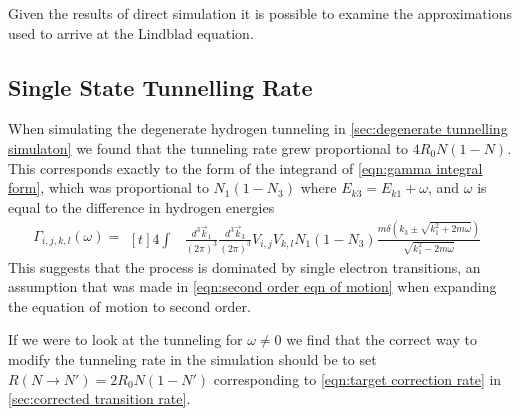 
Given the results of
direct simulation it is
possible to examine
the approximations
used to arrive at
the Lindblad equation.

\subsection{Single State Tunnelling Rate}\label{sec:lindblad corrected tunneling}
When simulating the
degenerate hydrogen tunneling in
\cref{sec:degenerate tunnelling simulaton}
we found that the tunneling rate
grew proportional to \(4R_0N(1-N)\).
This corresponds exactly to the
form of the integrand of
\cref{eqn:gamma integral form},
which was proportional to
\(N_1(1 - N_3)\) where
\(E_{k3} = E_{k1} + \omega{}\),
and \(\omega{}\) is equal to
the difference in hydrogen energies
\begin{equation}
    \Gamma_{i,j, k,l}(\omega)  =\begin{aligned}[t]
        4 \int &
        \frac{d^3\vec{k}_1}{{(2\pi)}^3}
        \frac{d^3\vec{k}_3}{{(2\pi)}^3}
        V_{i,j} V_{k,l}
        N_1 (1 - N_3)
        \frac{m\delta({k_3 \pm \sqrt{k_1^2 + 2m\omega}})}{\sqrt{k_1^2 - 2m\omega}}
    \end{aligned}
\end{equation}
This suggests
that the process
is dominated
by single electron
transitions, an assumption
that was made in \cref{eqn:second order eqn of motion}
when expanding the equation
of motion to second order.

If we were to look at the
tunneling for \(\omega \neq 0\)
we find that the correct
way to modify the tunneling
rate in the simulation should
be to set
\(R(N\rightarrow{}N') = 2R_0N(1-N')\)
corresponding to \cref{eqn:target correction rate}
in
\cref{sec:corrected transition rate}.



